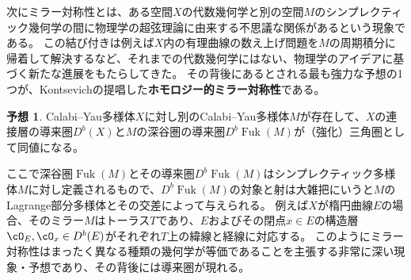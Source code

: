 \documentclass[uplatex,11pt,a4paper,dvipdfmx]{jsarticle}
\numberwithin{equation}{section}
\theoremstyle{definition}
\newtheorem{conjecture}[theorem]{予想}
\DeclareMathOperator{\Fuk}{Fuk}
\begin{document}
次にミラー対称性とは、ある空間$X$の代数幾何学と別の空間$M$のシンプレクティック幾何学の間に物理学の超弦理論に由来する不思議な関係があるという現象である。
この結び付きは例えば$X$内の有理曲線の数え上げ問題を$M$の周期積分に帰着して解決するなど、それまでの代数幾何学にはない、物理学のアイデアに基づく新たな進展をもたらしてきた。
その背後にあるとされる最も強力な予想の1つが、Kontsevichの提唱した\textbf{ホモロジー的ミラー対称性}である。
\begin{conjecture}
    Calabi--Yau多様体$X$に対し別のCalabi--Yau多様体$M$が存在して、$X$の連接層の導来圏$D^b (X)$と$M$の深谷圏の導来圏$D^b \Fuk(M)$が（強化）三角圏として同値になる。
\end{conjecture}
ここで深谷圏$\Fuk(M)$とその導来圏$D^b \Fuk(M)$はシンプレクティック多様体$M$に対し定義されるもので、$D^b \Fuk(M)$の対象と射は大雑把にいうと$M$のLagrange部分多様体とその交差によって与えられる。
例えば$X$が楕円曲線$E$の場合、そのミラー$M$はトーラス$T$であり、$E$およびその閉点$x \in E$の構造層$\cO_E, \cO_x \in D^b(E)$がそれぞれ$T$上の緯線と経線に対応する。
このようにミラー対称性はまったく異なる種類の幾何学が等価であることを主張する非常に深い現象・予想であり、その背後には導来圏が現れる。
\end{document}
